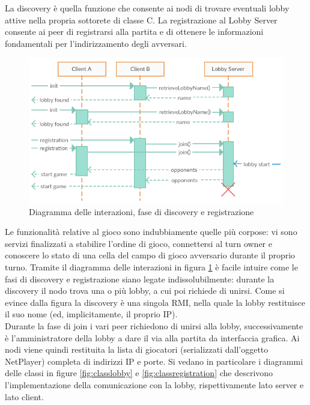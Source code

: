 La discovery è quella funzione che consente ai nodi di trovare eventuali 
lobby attive nella propria sottorete di classe C. La registrazione al Lobby 
Server consente ai peer di registrarsi alla partita e di ottenere le 
informazioni fondamentali per l'indirizzamento degli avversari.
\begin{figure}[!ht]
    \centering
    \includegraphics[scale=0.60,center]{core/imgs/UML/sequence/discovery.png}
    \caption{Diagramma delle interazioni, fase di discovery e registrazione}
    \label{fig:discoveryseq}
\end{figure}Le funzionalità 
relative al gioco sono indubbiamente quelle più corpose: vi sono servizi 
finalizzati a stabilire l'ordine di gioco, connettersi al turn owner e 
conoscere lo stato di una cella del campo di gioco avversario durante il 
proprio turno. Tramite il diagramma delle interazioni in figura \ref{fig:discoveryseq} 
è facile intuire come le fasi di discovery e registrazione siano legate 
indissolubilmente: durante la discovery il nodo trova una o più lobby, a cui 
poi richiede di unirsi. Come si evince dalla figura la discovery è una singola 
RMI, nella quale la lobby restituisce il suo nome (ed, implicitamente, il 
proprio IP). 
\\
Durante la fase di join i vari peer richiedono di unirsi alla 
lobby, successivamente è l'amministratore della lobby a dare il via alla 
partita da interfaccia grafica. Ai nodi viene quindi restituita la lista di 
giocatori (serializzati dall'oggetto NetPlayer) completa di indirizzi IP e 
porte. Si vedano in particolare i diagrammi delle classi in figure \ref{fig:classlobby}
e \ref{fig:classregistration} che descrivono l'implementazione della comunicazione con la lobby,
rispettivamente lato server e lato client.

